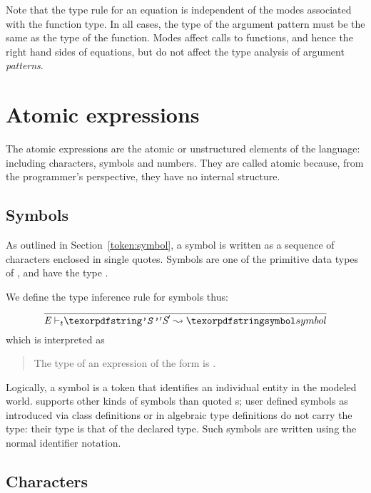 \begin{aside}
Note that the type rule for an equation is independent of the modes associated with the function type. In all cases, the type of the argument pattern must be the same as the type of the function. Modes affect calls to functions, and hence the right hand sides of equations, but do not affect the type analysis of argument \emph{patterns}.
\end{aside}

\section{Atomic expressions}
\label{expression:atomic}

The atomic \go expressions are the atomic or unstructured elements of the language: including characters, symbols and numbers. They are called atomic because, from the \go programmer's perspective, they have no internal structure. 

\subsection{Symbols}
\label{expression:symbol}

As outlined in Section~\vref{token:symbol}, a symbol is written as a sequence of characters enclosed in single quotes. Symbols are one of the primitive data types of \go, and have the type .

We define the type inference rule for symbols thus:
\begin{equation}
\frac{}
{\typeprd{E}{\q{'\emph{S}'}}\q{symbol}}
\end{equation}
which is interpreted as
\begin{quote}
The type of an expression of the form  is .
\end{quote}

Logically, a symbol is a token that identifies an individual entity in the modeled world. \go supports other kinds of symbols than quoted s; user defined symbols as introduced via class definitions or in algebraic type definitions do not carry the  type: their type is that of the declared type. Such symbols are written using the normal identifier notation.

\subsection{Characters}
\label{expression:character}

